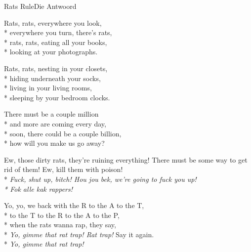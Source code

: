 \documentclass[10.5pt]{book}
\begin{document}
\fi
\iffalse
\begin{poem}{Rats Rule}{Die Antwoord}

\settowidth{\versewidth}{Soon, there could be a couple billion, how will you make us go away?}

Rats, rats, everywhere you look,\\*
everywhere you turn, there's rats,\\*
rats, rats, eating all your books,\\*
looking at your photographs.

Rats, rats, nesting in your closets,\\*
hiding underneath your socks,\\*
living in your living rooms,\\*
sleeping by your bedroom clocks.

There must be a couple million\\*
and more are coming every day,\\*
soon, there could be a couple billion,\\*
how will you make us go away?

Ew, those dirty rats, they're ruining everything! There must be some way to get rid of them! Ew, kill them with poison!\\*
\textit{Fuck, shut up, bitch! Hou jou bek, we're going to fuck you up!\\*
Fok alle kak rappers!}

Yo, yo, we back with the R to the A to the T,\\*
to the T to the R to the A to the P,\\*
when the rats wanna rap, they say,\\*
\textit{Yo, gimme that rat trap! Rat trap!} Say it again.\\*
\textit{Yo, gimme that rat trap!}


\end{poem}
\end{document}
